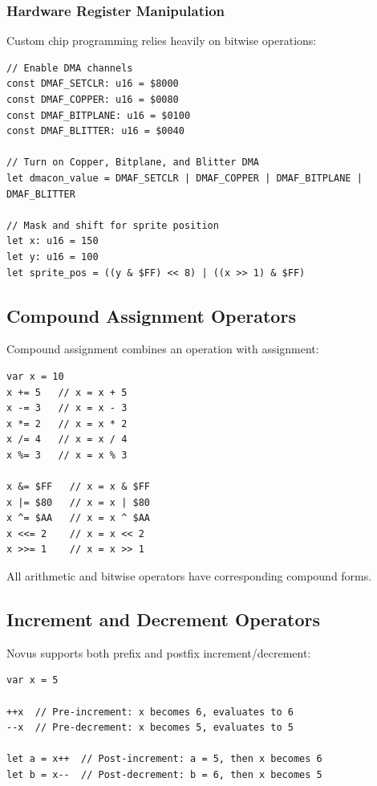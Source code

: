 \subsubsection{Hardware Register Manipulation}

Custom chip programming relies heavily on bitwise operations:

\begin{lstlisting}
// Enable DMA channels
const DMAF_SETCLR: u16 = $8000
const DMAF_COPPER: u16 = $0080
const DMAF_BITPLANE: u16 = $0100
const DMAF_BLITTER: u16 = $0040

// Turn on Copper, Bitplane, and Blitter DMA
let dmacon_value = DMAF_SETCLR | DMAF_COPPER | DMAF_BITPLANE | DMAF_BLITTER

// Mask and shift for sprite position
let x: u16 = 150
let y: u16 = 100
let sprite_pos = ((y & $FF) << 8) | ((x >> 1) & $FF)
\end{lstlisting}

\subsection{Compound Assignment Operators}

Compound assignment combines an operation with assignment:

\begin{lstlisting}
var x = 10
x += 5   // x = x + 5
x -= 3   // x = x - 3
x *= 2   // x = x * 2
x /= 4   // x = x / 4
x %= 3   // x = x % 3

x &= $FF   // x = x & $FF
x |= $80   // x = x | $80
x ^= $AA   // x = x ^ $AA
x <<= 2    // x = x << 2
x >>= 1    // x = x >> 1
\end{lstlisting}

All arithmetic and bitwise operators have corresponding compound forms.

\subsection{Increment and Decrement Operators}

Novus supports both prefix and postfix increment/decrement:

\begin{lstlisting}
var x = 5

++x  // Pre-increment: x becomes 6, evaluates to 6
--x  // Pre-decrement: x becomes 5, evaluates to 5

let a = x++  // Post-increment: a = 5, then x becomes 6
let b = x--  // Post-decrement: b = 6, then x becomes 5
\end{lstlisting}

